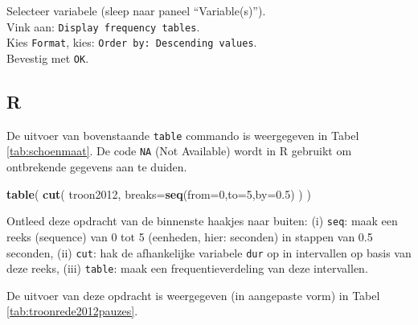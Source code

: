 \documentclass[
]{book}
\newenvironment{Shaded}{\begin{snugshade}}{\end{snugshade}}
\newcommand{\DataTypeTok}[1]{\textcolor[rgb]{0.13,0.29,0.53}{#1}}
\newcommand{\DecValTok}[1]{\textcolor[rgb]{0.00,0.00,0.81}{#1}}
\newcommand{\FloatTok}[1]{\textcolor[rgb]{0.00,0.00,0.81}{#1}}
\newcommand{\KeywordTok}[1]{\textcolor[rgb]{0.13,0.29,0.53}{\textbf{#1}}}
\newcommand{\NormalTok}[1]{#1}
\newcommand{\OperatorTok}[1]{\textcolor[rgb]{0.81,0.36,0.00}{\textbf{#1}}}
\newcommand{\OtherTok}[1]{\textcolor[rgb]{0.56,0.35,0.01}{#1}}
\newcommand{\StringTok}[1]{\textcolor[rgb]{0.31,0.60,0.02}{#1}}
\begin{document}
Selecteer variabele (sleep naar paneel ``Variable(s)'').\\
Vink aan: \texttt{Display\ frequency\ tables}.\\
Kies \texttt{Format}, kies: \texttt{Order\ by:\ Descending\ values}.\\
Bevestig met \texttt{OK}.\\

\hypertarget{r-1}{%
\subsection{R}\label{r-1}}

\begin{Shaded}
\end{Shaded}

De uitvoer van bovenstaande \texttt{table} commando is weergegeven in Tabel \ref{tab:schoenmaat}.
De code \texttt{NA} (Not Available) wordt in R gebruikt om ontbrekende gegevens aan te duiden.

\begin{Shaded}
\begin{Highlighting}[]
\KeywordTok{table}\NormalTok{( }\KeywordTok{cut}\NormalTok{( troon2012, }\DataTypeTok{breaks=}\KeywordTok{seq}\NormalTok{(}\DataTypeTok{from=}\DecValTok{0}\NormalTok{,}\DataTypeTok{to=}\DecValTok{5}\NormalTok{,}\DataTypeTok{by=}\FloatTok{0.5}\NormalTok{) ) )}
\end{Highlighting}
\end{Shaded}

Ontleed deze opdracht van de binnenste haakjes naar buiten:
(i) \texttt{seq}: maak een reeks (sequence) van 0 tot 5 (eenheden, hier: seconden) in stappen van 0.5 seconden,
(ii) \texttt{cut}: hak de afhankelijke variabele \texttt{dur} op in intervallen op basis van deze reeks,
(iii) \texttt{table}: maak een frequentieverdeling van deze intervallen.

De uitvoer van deze opdracht is weergegeven (in aangepaste vorm) in Tabel \ref{tab:troonrede2012pauzes}.
\end{document}
